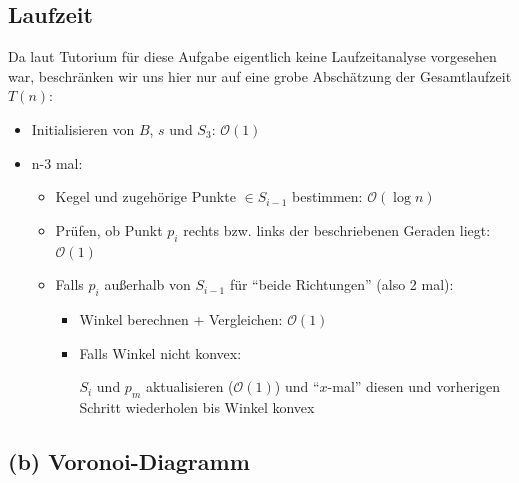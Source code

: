 \documentclass[a4paper]{article}
\begin{document}
\subsection*{Laufzeit}
Da laut Tutorium für diese Aufgabe eigentlich keine Laufzeitanalyse vorgesehen war, beschränken wir uns hier nur auf eine grobe Abschätzung
der Gesamtlaufzeit $T(n)$:

\begin{itemize}
 \item Initialisieren von $B$, $s$ und $S_3$: $\mathcal{O}(1)$
 \item n-3 mal:
 \begin{itemize}
  \item Kegel und zugehörige Punkte $\in S_{i-1}$ bestimmen: $\mathcal{O}(\log n)$
  \item Prüfen, ob Punkt $p_i$ rechts bzw. links der beschriebenen Geraden liegt: $\mathcal{O}(1)$
  \item Falls $p_i$ außerhalb von $S_{i-1}$ für "`beide Richtungen"' (also 2 mal):
  \begin{itemize}
   \item Winkel berechnen + Vergleichen: $\mathcal{O}(1)$
   \item Falls Winkel nicht konvex:
   
    $S_i$ und $p_m$ aktualisieren ($\mathcal{O}(1)$) und "`$x$-mal"' diesen und vorherigen Schritt wiederholen bis Winkel konvex
  \end{itemize}

 \end{itemize}

\end{itemize}




\subsection*{(b) Voronoi-Diagramm}

  
\end{document}
